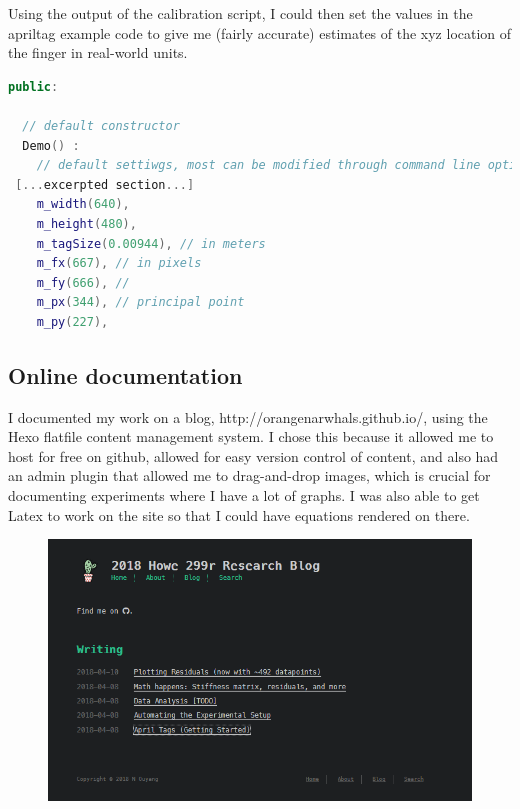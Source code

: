 \documentclass[preprint,12pt,3p]{elsarticle}
\begin{document}
Using the output of the calibration script, I could then set the values in the apriltag example code
to give me (fairly accurate) estimates of the xyz location of the finger in real-world units.



\begin{lstlisting}[language=C++,breaklines]
public:

  // default constructor
  Demo() :
    // default settiwgs, most can be modified through command line options (see below)
 [...excerpted section...]
    m_width(640),
    m_height(480),
    m_tagSize(0.00944), // in meters
    m_fx(667), // in pixels
    m_fy(666), //
    m_px(344), // principal point
    m_py(227),
\end{lstlisting}



\subsection{Online documentation}
I documented my work on a blog, http://orangenarwhals.github.io/, using the Hexo flatfile content
management system. I chose this because it allowed me to host for free on github, allowed for easy
version control of content, and also had an admin plugin that allowed me to drag-and-drop images,
which is crucial for documenting experiments where I have a lot of graphs. I was also able to get
Latex to work on the site so that I could have equations rendered on there.

\begin{figure}[H]
\centering
\includegraphics[width=.8\textwidth]{images/misc/blog.png}
\end{figure}
\end{document}
